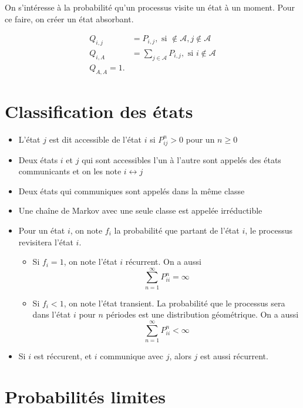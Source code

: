 On s'intéresse à la probabilité qu'un processus visite un état à un moment. Pour ce faire, on créer un état absorbant.  

\begin{align*}
Q_{i,j} &= P_{i,j}, \text{ si } \notin \mathcal{A}, j\notin \mathcal{A}\\
Q_{i,A} &= \sum_{j\in \mathcal{A}} P_{i,j}, \text{ si } i\notin \mathcal{A}\\
Q_{A, A} = 1.
\end{align*}

\section{Classification des états}

\begin{itemize}
	\item L'état $j$ est dit accessible de l'état $i$ si $P_{ij}^n > 0$ pour un $n\geq 0$
	\item Deux états $i$ et $j$ qui sont accessibles l'un à l'autre sont appelés des états communicants et on les note $i\leftrightarrow j$
	\item Deux états qui communiques sont appelés dans la même classe
	\item Une chaîne de Markov avec une seule classe est appelée irréductible
	\item Pour un état $i$, on note $f_i$ la probabilité que partant de l'état $i$, le processus revisitera l'état $i$. 
	\begin{itemize}
		\item Si $f_i = 1$, on note l'état $i$ récurrent. On a aussi 
		$$\sum_{n = 1}^{\infty} P_{ii}^n = \infty$$
		\item Si $f_i < 1$, on note l'état transient. La probabilité que le processus sera dans l'état $i$ pour $n$ périodes est une distribution géométrique. On a aussi
		$$\sum_{n = 1}^{\infty} P_{ii}^n < \infty$$
	\end{itemize}
	\item Si $i$ est réccurent, et $i$ communique avec $j$, alors $j$ est aussi récurrent. 
\end{itemize}

\section{Probabilités limites}

